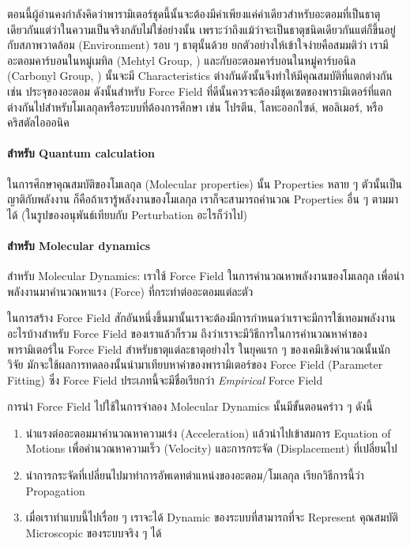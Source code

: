 ตอนนี้ผู้อ่านคงกำลังคิดว่าพารามิเตอร์ชุดนี้นั้นจะต้องมีค่าเพียงแค่ค่าเดียวสำหรับอะตอมที่เป็นธาตุเดียวกันแต่ว่าในความเป็นจริงกลับไม่ใช่อย่างนั้น%
เพราะว่าถึงแม้ว่าจะเป็นธาตุชนิดเดียวกันแต่ก็ขึ้นอยู่กับสภาพวาดล้อม (Environment) รอบ ๆ ธาตุนั้นด้วย ยกตัวอย่างให้เข้าใจง่ายคือสมมติว่า%
เรามีอะตอมคาร์บอนในหมู่เมทิล (Mehtyl Group, ) และกับอะตอมคาร์บอนในหมู่คาร์บอนิล (Carbonyl Group, )
นั้นจะมี Characteristics ต่างกันดังนั้นจึงทำให้มีคุณสมบัติที่แตกต่างกัน เช่น ประจุของอะตอม ดังนั้นสำหรับ Force Field
ที่ดีนั้นควรจะต้องมีชุดเซตของพารามิเตอร์ที่แตกต่างกันไปสำหรับโมเลกุลหรือระบบที่ต้องการศึกษา เช่น โปรตีน, โลหะออกไซด์, พอลิเมอร์, หรือคริสตัลไอออนิค

\paragraph{สำหรับ Quantum calculation}
ในการศึกษาคุณสมบัติของโมเลกุล (Molecular properties) นั้น Properties หลาย ๆ ตัวนั้นเป็นญาติกับพลังงาน ก็คือถ้าเรารู้พลังงานของโมเลกุล 
เราก็จะสามารถคำนวณ Properties อื่น ๆ ตามมาได้ (ในรูปของอนุพันธ์เทียบกับ Perturbation อะไรก็ว่าไป)

\paragraph{สำหรับ Molecular dynamics}
สำหรับ Molecular Dynamics: เราใช้ Force Field ในการคำนวณหาพลังงานของโมเลกุล เพื่อนำพลังงานมาคำนวณหาแรง (Force) 
ที่กระทำต่ออะตอมแต่ละตัว

ในการสร้าง Force Field สักอันหนึ่งขึ้นมานั้นเราจะต้องมีการกำหนดว่าเราจะมีการใช้เทอมพลังงานอะไรบ้างสำหรับ Force Field ของเราแล้วก็รวม%
ถึงว่าเราจะมีวิธีการในการคำนวณหาค่าของพารามิเตอร์ใน Force Field สำหรับธาตุแต่ละธาตุอย่างไร ในยุคแรก ๆ ของเคมีเชิงคำนวณนั้นนักวิจัย%
มักจะใช้ผลการทดลองนั้นนำมาเทียบหาค่าของพารามิเตอร์ของ Force Field (Parameter Fitting) ซึ่ง Force Field ประเภทนี้จะมีชื่อเรียกว่า
\textit{Empirical} Force Field

การนำ Force Field ไปใช้ในการจำลอง Molecular Dynamics นั้นมีขั้นตอนคร่าว ๆ ดังนี้

\begin{enumerate}[topsep=0pt,noitemsep]
  \setlength\itemsep{1em}
  \item นำแรงต่ออะตอมมาคำนวณหาความเร่ง (Acceleration) แล้วนำไปเข้าสมการ Equation of Motions
        เพื่อคำนวณหาความเร็ว (Velocity) และการกระจัด (Displacement) ที่เปลี่ยนไป

  \item นำการกระจัดที่เปลี่ยนไปมาทำการอัพเดทตำแหน่งของอะตอม/โมเลกุล เรียกวิธีการนี้ว่า Propagation

  \item เมื่อเราทำแบบนี้ไปเรื่อย ๆ เราจะได้ Dynamic ของระบบที่สามารถที่จะ Represent คุณสมบัติ Microscopic ของระบบจริง ๆ ได้
\end{enumerate}

